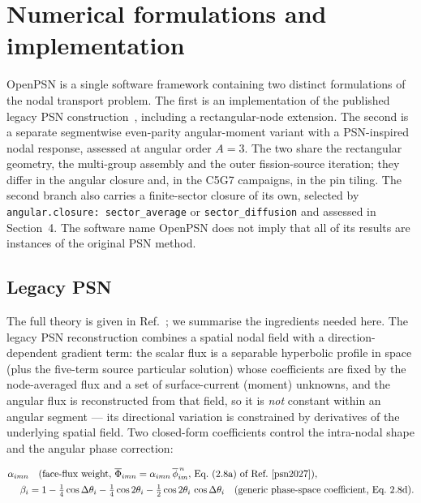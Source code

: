 \documentclass[11pt,a4paper]{article}
\begin{document}
\section{Numerical formulations and implementation}

OpenPSN is a single software framework containing two distinct
formulations of the nodal transport problem. The first is an
implementation of the published legacy PSN construction~\cite{psn2027},
including a rectangular-node extension. The second is a separate
segmentwise even-parity angular-moment variant with a PSN-inspired
nodal response, assessed at angular order $A{=}3$. The two share the
rectangular geometry, the multi-group assembly and the outer
fission-source iteration; they differ in the angular closure and, in the
C5G7 campaigns, in the pin tiling. The second branch also carries a
finite-sector closure of its own, selected by
\texttt{angular.closure: sector\_average} or
\texttt{sector\_diffusion} and assessed in Section~4. The software name
OpenPSN does not imply that all of its results are instances of the
original PSN method.

\subsection{Legacy PSN}

The full theory is given in Ref.~\cite{psn2027}; we summarise the
ingredients needed here. The legacy PSN reconstruction combines a
spatial nodal field with a direction-dependent gradient term: the
scalar flux is a separable hyperbolic profile in space (plus the
five-term source particular solution) whose coefficients are fixed by
the node-averaged flux and a set of surface-current (moment) unknowns,
and the angular flux is reconstructed from that field, so it is \emph{not}
constant within an angular segment --- its directional variation is
constrained by derivatives of the underlying spatial field. Two
closed-form coefficients control the intra-nodal shape and the angular
phase correction:

\begin{align}
\alpha_{imn} &\quad\text{(face-flux weight, }\overline{\Phi}_{imn}
=\alpha_{imn}\,\overline{\phi}_{im}^{\,n}\text{, Eq.~(2.8a) of
Ref.~\cite{psn2027}),}\\
\beta_i  &= 1-\tfrac{1}{4}\cos\Delta\theta_i-\tfrac{1}{4}\cos 2\theta_i
          -\tfrac{1}{2}\cos 2\theta_i\,\cos\Delta\theta_i
          \quad\text{(generic phase-space coefficient, Eq.~2.8d).}
\end{align}
\end{document}
